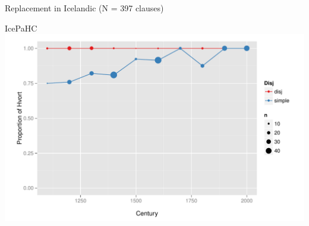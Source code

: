 \documentclass[hyperref={pdfpagelabels=false}]{beamer}
\begin{document}
\begin{frame}{Replacement in Icelandic (N = 397 clauses)}

\begin{center}
IcePaHC \citep{icepahc09}
\includegraphics[width=1.1\textwidth]{whetherifIce.pdf}

\end{center}
\end{frame}

%
%
%
\end{document}
